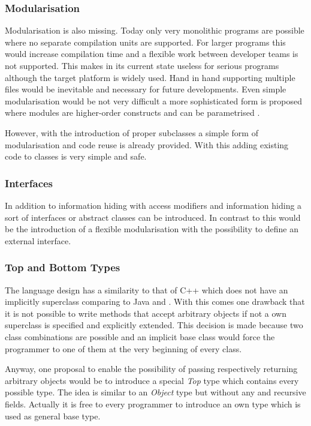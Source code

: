 \subsubsection{Modularisation}
Modularisation is also missing. Today only very monolithic programs
are possible where no separate compilation units are supported. For larger
programs this would increase compilation time and a flexible work between
developer teams is not supported. This makes \ooplss in its current state
useless for serious programs although the target platform is widely
used. Hand in hand supporting multiple files would be inevitable and
necessary for future developments. Even simple modularisation would be
not very difficult a more sophisticated form is proposed where modules are
higher-order constructs and can be parametrised \cite{dreyer_type_2003}.

However, with the introduction of proper subclasses a simple form of
modularisation and code reuse is already provided. With this adding
existing code to classes is very simple and safe.

\subsubsection{Interfaces}
In addition to information hiding with access modifiers and information
hiding a sort of interfaces or abstract classes can be introduced. In
contrast to this would be the introduction of a flexible modularisation
with the possibility to define an external interface.

\subsubsection{Top and Bottom Types}
The language design has a similarity to that of C++ which does
not have an implicitly superclass comparing to Java and \cs. With this
comes one drawback that it is not possible to write methods that accept
arbitrary objects if not a own superclass is specified and explicitly
extended. This decision is made because two class combinations are
possible and an implicit base class would force the programmer to one
of them at the very beginning of every class.

Anyway, one proposal to enable the possibility of passing respectively
returning arbitrary objects would be to introduce a special \emph{Top}
type which contains every possible type. The idea is similar to an
\emph{Object} type but without any \mytype and recursive fields. Actually
it is free to every programmer to introduce an own type which is used
as general base type.


